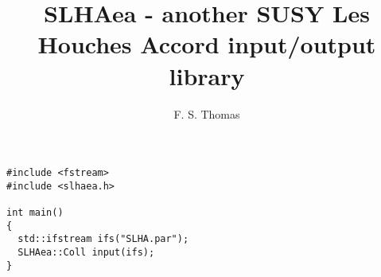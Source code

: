 \documentclass[
  11pt,
  ]{revtex4-1}
\begin{document}
\title{SLHAea - another SUSY Les Houches Accord input/output library}

\author{F. S. Thomas}

\begin{abstract}
\end{abstract}

\maketitle
\tableofcontents


\begin{lstlisting}
#include <fstream>
#include <slhaea.h>

int main()
{
  std::ifstream ifs("SLHA.par");
  SLHAea::Coll input(ifs);
}
\end{lstlisting}




\nocite{*}
\end{document}

